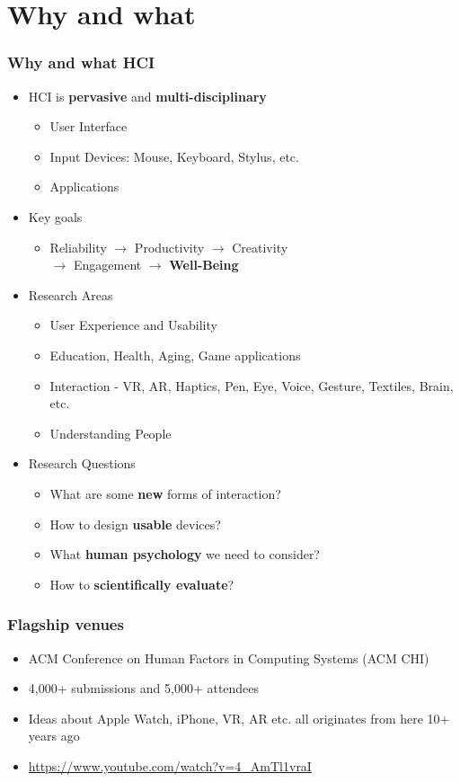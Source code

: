 \documentclass{beamer}
\begin{document}
\section{Why and what} %

\begin{frame}
\frametitle{Why and what HCI}
\begin{itemize}
	\item HCI is \textbf{pervasive} and \textbf{multi-disciplinary}
	\begin{itemize}
		\item User Interface
		\item Input Devices: Mouse, Keyboard, Stylus, etc.
		\item Applications
	\end{itemize}
	\item Key goals
	\begin{itemize}
		\item Reliability $\rightarrow$ Productivity $\rightarrow$ Creativity \\  $\rightarrow$ Engagement $\rightarrow$ \textbf{Well-Being }
	\end{itemize}
	\item Research Areas
	\begin{itemize}
		\item User Experience and Usability
		\item Education, Health, Aging, Game applications
		\item Interaction - VR, AR, Haptics, Pen, Eye, Voice, Gesture, Textiles, Brain, etc.
		\item Understanding People
	\end{itemize}
	\item Research Questions
	\begin{itemize}
		\item What are some \textbf{new} forms of interaction?
		\item How to design \textbf{usable} devices?
		\item What \textbf{human psychology} we need to consider?
		\item How to \textbf{scientifically evaluate}?
	\end{itemize}
\end{itemize}
\end{frame}

\begin{frame}
\frametitle{Flagship venues}
\begin{itemize}
	\item ACM Conference on Human Factors in Computing Systems (ACM CHI)
	\item 4,000+ submissions and 5,000+ attendees
	\item Ideas about Apple Watch, iPhone, VR, AR etc. all originates from here 10+ years ago
	\item \url{https://www.youtube.com/watch?v=4_AmTl1vraI}
\end{itemize}
\end{frame}
\end{document}
